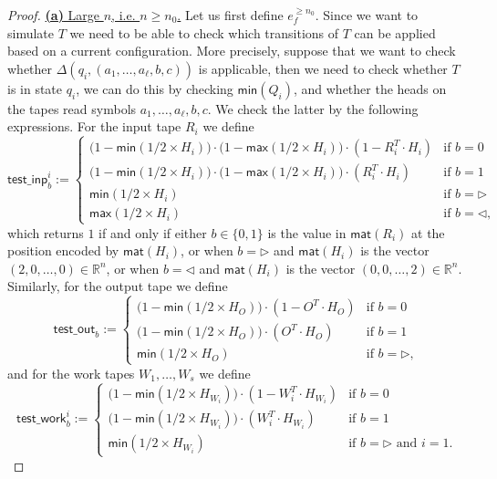 \begin{proof}
\medskip
\noindent
\underline{\textbf{(a)} Large $n$, i.e. $n\geq n_0$.}
    Let us first define $e_f^{\geq n_0}$. Since we want to simulate $T$ we need to be able to check which 
    transitions of $T$ can be applied based on a current configuration. More precisely,
    suppose that we want to check whether $\Delta(q_i,(a_1,\ldots,a_{\ell},b,c))$ is applicable, then we 
    need to check whether $T$ is in state $q_i$, we can do this by checking 
    $\mathsf{min}(Q_i)$, and whether the heads on the tapes read symbols $a_1,\ldots,a_{\ell},b,c$. We 
    check the latter by the following expressions.
    For the input tape $R_i$ we define
    $$
    \mathsf{test\_inp}^i_b:=\begin{cases}
    \bigl(1-\mathsf{min}(1/2\times H_i)\bigr)\cdot \bigl(1-\mathsf{max}(1/2\times H_i)\bigr)\cdot(1- R_i^T\cdot H_i) & \text{if $b=0$}\\
    \bigl(1-\mathsf{min}(1/2\times H_i)\bigr)\cdot\bigl(1-\mathsf{max}(1/2\times H_i)\bigr)\cdot(R_i^T\cdot H_i) & \text{if $b=1$}\\
    \mathsf{min}(1/2\times H_i) & \text{if $b=\rhd$}\\
    \mathsf{max}(1/2\times H_i) & \text{if $b=\lhd$},
    \end{cases}
    $$
    which returns $1$ if and only if either $b\in\{0,1\}$ is the value in $\mathsf{mat}(R_i)$ at the 
    position encoded by $\mathsf{mat}(H_i)$, or when $b=\rhd$ and $\mathsf{mat}(H_i)$ is the vector 
    $(2,0,\ldots,0)\in\mathbb{R}^n$, or when $b=\lhd$ and $\mathsf{mat}(H_i)$ is the vector 
    $(0,0,\ldots,2)\in\mathbb{R}^n$. Similarly, for the output tape we define
    $$
    \mathsf{test\_out}_b:=\begin{cases}
    \bigl(1-\mathsf{min}(1/2\times H_O)\bigr)\cdot(1- O^T\cdot H_O) & \text{if $b=0$}\\
    \bigl(1-\mathsf{min}(1/2\times H_O)\bigr)\cdot(O^T\cdot H_O) & \text{if $b=1$}\\
    \mathsf{min}(1/2\times H_O) & \text{if $b=\rhd$},
    \end{cases}
    $$
    and for the work tapes $W_1,\ldots,W_s$ we define
    $$
    \mathsf{test\_work}^i_b:=\begin{cases}
    \bigl(1-\mathsf{min}(1/2\times H_{W_i})\bigr)\cdot(1- W_i^T\cdot H_{W_i}) & \text{if $b=0$}\\
    \bigl(1-\mathsf{min}(1/2\times H_{W_i})\bigr)\cdot (W_i^T\cdot H_{W_i}) & \text{if $b=1$}\\
    \mathsf{min}(1/2\times H_{W_i}) & \text{if $b=\rhd$ and $i=1$}.

\end{cases}$$
\end{proof}
